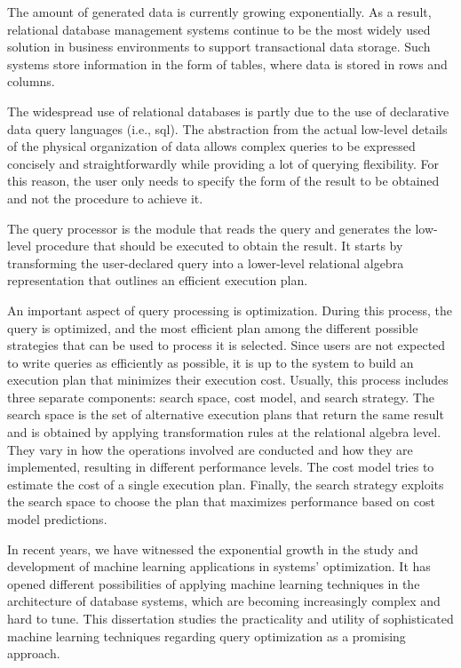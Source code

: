 The amount of generated data is currently growing exponentially. As a result, relational database management systems continue to be the most widely used solution in business environments to support transactional data storage. Such systems store information in the form of tables, where data is stored in rows and columns.

The widespread use of relational databases is partly due to the use of declarative data query languages (i.e., \gls{sql}). The abstraction from the actual low-level details of the physical organization of data allows complex queries to be expressed concisely and straightforwardly while providing a lot of querying flexibility. For this reason, the user only needs to specify the form of the result to be obtained and not the procedure to achieve it.

The query processor is the module that reads the query and generates the low-level procedure that should be executed to obtain the result. It starts by transforming the user-declared query into a lower-level relational algebra representation that outlines an efficient execution plan.

An important aspect of query processing is optimization. During this process, the query is optimized, and the most efficient plan among the different possible strategies that can be used to process it is selected. Since users are not expected to write queries as efficiently as possible, it is up to the system to build an execution plan that minimizes their execution cost. Usually, this process includes three separate components: search space, cost model, and search strategy. The search space is the set of alternative execution plans that return the same result and is obtained by applying transformation rules at the relational algebra level. They vary in how the operations involved are conducted and how they are implemented, resulting in different performance levels. The cost model tries to estimate the cost of a single execution plan. Finally, the search strategy exploits the search space to choose the plan that maximizes performance based on cost model predictions.


In recent years, we have witnessed the exponential growth in the study and development of machine learning applications in systems' optimization. It has opened different possibilities of applying machine learning techniques in the architecture of database systems, which are becoming increasingly complex and hard to tune. This dissertation studies the practicality and utility of sophisticated machine learning techniques regarding query optimization as a promising approach.
